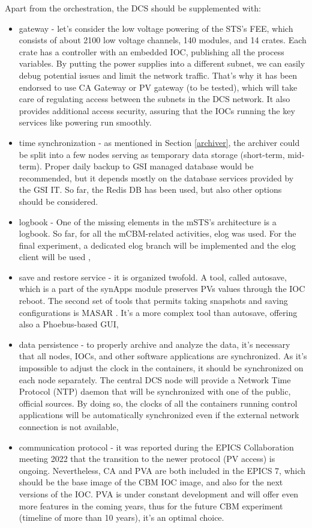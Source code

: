  Apart from the orchestration, the \gls{DCS} should be supplemented with:
 \begin{itemize}
      \item gateway - let's consider the low voltage powering of the STS's \gls{FEE}, which consists of about 2100 low voltage channels, 140 modules, and 14 crates. Each crate has a controller with an embedded \gls{IOC}, publishing all the process variables. By putting the power supplies into a different subnet, we can easily debug potential issues and limit the network traffic. That's why it has been endorsed to use CA Gateway \cite{gateway} or \gls{PV} gateway (to be tested), which will take care of regulating access between the subnets in the DCS network. It also provides additional access security, assuring that the \glspl{IOC} running the key services like powering run smoothly.
     \item time synchronization - as mentioned in Section \ref{archiver}, the archiver could be split into a few nodes serving as temporary data storage (short-term, mid-term). Proper daily backup to GSI managed database would be recommended, but it depends mostly on the database services provided by the GSI IT. So far, the Redis DB has been used, but also other options should be considered.       
     \item logbook - One of the missing elements in the \gls{mSTS}'s architecture is a logbook. So far, for all the mCBM-related activities, elog \cite{elog} was used. For the final experiment, a dedicated elog branch will be implemented and the elog client will be used \cite{elog_client},
     \item save and restore service - it is organized twofold. A tool, called autosave, which is a part of the synApps module \cite{autosave} preserves \glspl{PV} values through the \gls{IOC} reboot. The second set of tools that permits taking snapshots and saving configurations is MASAR \cite{masar}. It's a more complex tool than autosave, offering also a Phoebus-based \gls{GUI},
     \item data persistence - to properly archive and analyze the data, it's necessary that all nodes, \glspl{IOC}, and other software applications are synchronized. As it's impossible to adjust the clock in the containers, it should be synchronized on each node separately. The central \gls{DCS} node will provide a Network Time Protocol (\gls{NTP}) daemon that will be synchronized with one of the public, official sources.  By doing so, the clocks of all the containers running control applications will be automatically synchronized even if the external network connection is not available,
     \item communication protocol - it was reported during the EPICS Collaboration meeting 2022 \cite{epics_2022} that the transition to the newer protocol (PV access) is ongoing. Nevertheless, CA and PVA are both included in the EPICS 7, which should be the base image of the \gls{CBM} \gls{IOC} image, and also for the next versions of the \gls{IOC}. PVA is under constant development and will offer even more features in the coming years, thus for the future CBM experiment (timeline of more than 10 years), it's an optimal choice. 
 \end{itemize}


